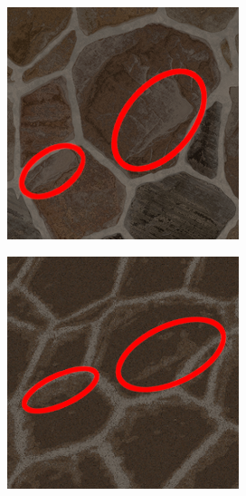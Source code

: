 \bigskip

\begin{figure}
    \centering
    \begin{subfigure}{.45\textwidth}
        \centering
        \includegraphics[width=\textwidth]{contenu/resources/images/marks}
    \end{subfigure}
    \hfill
    \begin{subfigure}{.45\textwidth}
        \centering
        \includegraphics[width=\textwidth]{contenu/resources/images/mark_preserved}
    \end{subfigure}


\end{figure}
